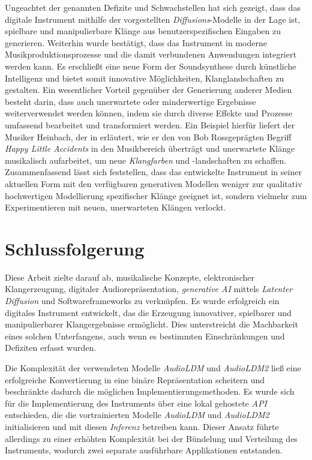 \documentclass[
  a4paper,  %
  twoside,  %
  bibliography=totoc,
  headsepline,
  cleardoublepage=empty,
  parskip=half,
  draft=false
]{scrbook}
\begin{document}
Ungeachtet der genannten Defizite und Schwachstellen hat sich gezeigt, dass das digitale Instrument mithilfe der vorgestellten \emph{Diffusions}-Modelle in der Lage ist, spielbare und manipulierbare Klänge aus benutzerspezifischen Eingaben zu generieren. Weiterhin wurde bestätigt, dass das Instrument in moderne Musikproduktionsprozesse und die damit verbundenen Anwendungen integriert werden kann. Es erschließt eine neue Form der Soundsynthese durch künstliche Intelligenz und bietet somit innovative Möglichkeiten, Klanglandschaften zu gestalten. Ein wesentlicher Vorteil gegenüber der Generierung anderer Medien besteht darin, dass auch unerwartete oder minderwertige Ergebnisse weiterverwendet werden können, indem sie durch diverse Effekte und Prozesse umfassend bearbeitet und transformiert werden. Ein Beispiel hierfür liefert der Musiker \glqq Heinbach\grqq, der in \cite{hainbach_how_2021} erläutert, wie er den von \glqq Bob Ross\grqq geprägten Begriff \emph{Happy Little Accidents} in den Musikbereich überträgt und unerwartete Klänge musikalisch aufarbeitet, um neue \emph{Klangfarben} und -landschaften zu schaffen. Zusammenfassend lässt sich feststellen, dass das entwickelte Instrument in seiner aktuellen Form mit den verfügbaren generativen Modellen weniger zur qualitativ hochwertigen Modellierung spezifischer Klänge geeignet ist, sondern vielmehr zum Experimentieren mit neuen, unerwarteten Klängen verlockt.

\chapter{Schlussfolgerung}
Diese Arbeit zielte darauf ab, musikalische Konzepte, elektronischer Klangerzeugung, digitaler Audiorepräsentation, \emph{generative AI} mittels \emph{Latenter Diffusion} und Softwareframeworks zu verknüpfen. Es wurde erfolgreich ein digitales Instrument entwickelt, das die Erzeugung innovativer, spielbarer und manipulierbarer Klangergebnisse ermöglicht. Dies unterstreicht die Machbarkeit eines solchen Unterfangens, auch wenn es bestimmten Einschränkungen und Defiziten erfasst wurden.

Die Komplexität der verwendeten Modelle \emph{AudioLDM} \cite{liu_audioldm_2023} und \emph{AudioLDM2} \cite{liu_audioldm2_2023} ließ eine erfolgreiche Konvertierung in eine binäre Repräsentation scheitern und beschränkte dadurch die möglichen Implementierungsmethoden. Es wurde sich für die Implementierung des Instruments über eine lokal gehostete \emph{API} entschieden, die die vortrainierten Modelle \emph{AudioLDM} und \emph{AudioLDM2} initialisieren und mit diesen \emph{Inferenz} betreiben kann. Dieser Ansatz führte allerdings zu einer erhöhten Komplexität bei der Bündelung und Verteilung des Instruments, wodurch zwei separate ausführbare Applikationen entstanden.
\end{document}
